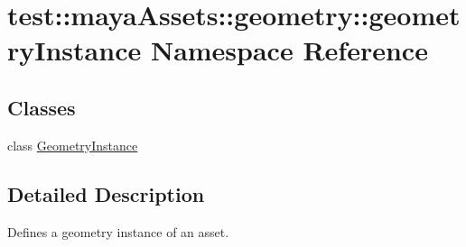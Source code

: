 \hypertarget{namespacetest_1_1mayaAssets_1_1geometry_1_1geometryInstance}{\section{test\-:\-:maya\-Assets\-:\-:geometry\-:\-:geometry\-Instance \-Namespace \-Reference}
\label{d1/d4b/namespacetest_1_1mayaAssets_1_1geometry_1_1geometryInstance}
}
\subsection*{\-Classes}
\begin{DoxyCompactItemize}
\item 
class \hyperlink{classtest_1_1mayaAssets_1_1geometry_1_1geometryInstance_1_1GeometryInstance}{\-Geometry\-Instance}
\end{DoxyCompactItemize}


\subsection{\-Detailed \-Description}
\begin{DoxyVerb}
Defines a geometry instance of an asset.
\end{DoxyVerb}
 